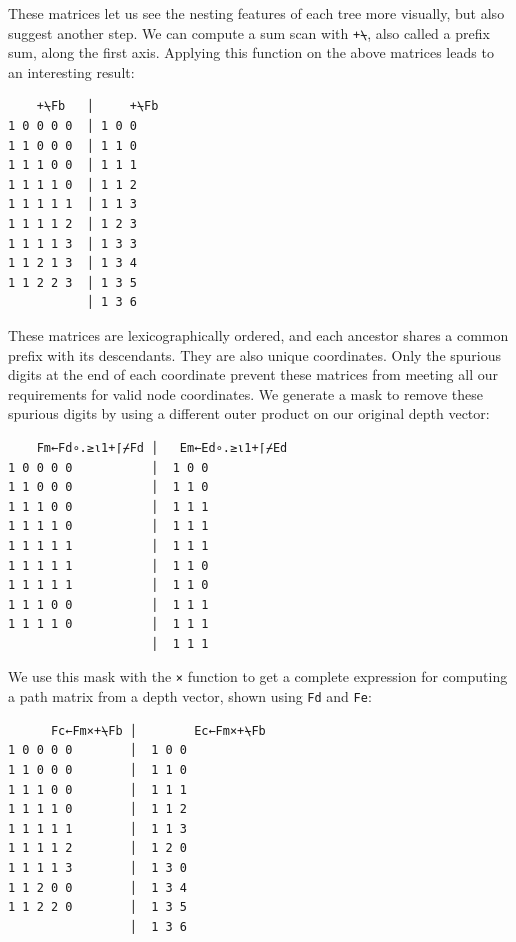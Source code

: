 ﻿\documentclass[numbers,10pt,preprint]{sigplanconf}
\begin{document}
\noindent These matrices let us see the nesting features of each tree more visually, but also suggest another step. We can compute a sum scan with \verb;+⍀;, also called a prefix sum, along the first axis. Applying this function on the above matrices leads to an interesting result:

\begin{verbatim}
    +⍀Fb   │     +⍀Fb
1 0 0 0 0  │ 1 0 0
1 1 0 0 0  │ 1 1 0
1 1 1 0 0  │ 1 1 1
1 1 1 1 0  │ 1 1 2
1 1 1 1 1  │ 1 1 3
1 1 1 1 2  │ 1 2 3
1 1 1 1 3  │ 1 3 3
1 1 2 1 3  │ 1 3 4
1 1 2 2 3  │ 1 3 5
           │ 1 3 6
\end{verbatim}

\noindent These matrices are lexicographically ordered, and each ancestor shares a common prefix with its descendants. They are also unique coordinates. Only the spurious digits at the end of each coordinate prevent these matrices from meeting all our requirements for valid node coordinates. We generate a mask to remove these spurious digits by using a different outer product on our original depth vector:

\begin{verbatim}
    Fm←Fd∘.≥⍳1+⌈⌿Fd │   Em←Ed∘.≥⍳1+⌈⌿Ed
1 0 0 0 0           │  1 0 0
1 1 0 0 0           │  1 1 0
1 1 1 0 0           │  1 1 1
1 1 1 1 0           │  1 1 1
1 1 1 1 1           │  1 1 1
1 1 1 1 1           │  1 1 0
1 1 1 1 1           │  1 1 0
1 1 1 0 0           │  1 1 1
1 1 1 1 0           │  1 1 1
                    │  1 1 1
\end{verbatim}

%

\noindent We use this mask with the \verb;×; function to get a complete expression for computing a path matrix from a depth vector, shown using \verb;Fd; and \verb;Fe;:

\begin{verbatim}
      Fc←Fm×+⍀Fb │        Ec←Fm×+⍀Fb
1 0 0 0 0        │  1 0 0
1 1 0 0 0        │  1 1 0
1 1 1 0 0        │  1 1 1
1 1 1 1 0        │  1 1 2
1 1 1 1 1        │  1 1 3
1 1 1 1 2        │  1 2 0
1 1 1 1 3        │  1 3 0
1 1 2 0 0        │  1 3 4
1 1 2 2 0        │  1 3 5
                 │  1 3 6
\end{verbatim}
\end{document}
